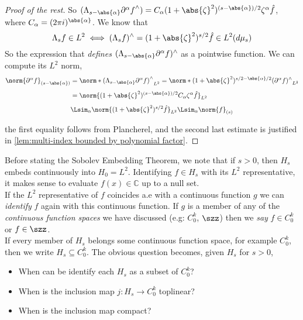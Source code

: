 \documentclass[../main-v2-manifolds.tex]{subfiles}
\begin{document}
\begin{proof}[Proof of the rest]
So $({\Lambda_{s-\abs{\alpha}}\partial^\alpha f}^{\wedge}) = C_{\alpha} (1+\abs{\zeta}^2)^{(s-\abs{\alpha})/2} \zeta^\alpha \hat{f}$, where $C_\alpha = (2\pi i)^{\abs{\alpha}}$. We know that 
\[
\Lambda_s f\in L^2\iff (\Lambda_s f)^{\wedge} = (1+\abs{\zeta}^2)^{s/2}\hat{f}\in L^2(d\mu_s)
\]
So the expression that \emph{defines} $(\Lambda_{s-\abs{\alpha}}\partial^\alpha f)^{\wedge}$ as a pointwise function. We can compute its $L^2$ norm, 
\begin{align*}
\norm{\partial^{\alpha}f}_{(s-\abs{\alpha})} &=\norm*{{(\Lambda_{s-\abs{\alpha}}\partial^\alpha f)}^{\wedge}}_{L^2}= \norm*{(1+\abs{\zeta}^2)^{s/2 - \abs{\alpha}/2}(\partial^\alpha f)^{\wedge}}_{L^2}\\[1ex]
&= \norm{(1+\abs{\zeta}^2)^{(s-\abs{\alpha})/2}C_{\alpha}\zeta^{\alpha}\hat{f}}_{L^2}\\[1ex]
&\Lsim_{\alpha}\norm{(1+\abs{\zeta}^2)^{s/2}\hat{f}}_{L^2}\Lsim_{\alpha}\norm{f}_{(s)}
\end{align*}

the first equality follows from Plancherel, and the second last estimate is justified in \cref{lem:multi-index bounded by polynomial factor}.
\end{proof}





Before stating the Sobolev Embedding Theorem, we note that if $s>0$, then $H_s$ embeds continuously into $H_0 = L^2$. Identifying $f\in H_s$ with its $L^2$ representative, it makes sense to evaluate $f(x)\in\mathbb{C}$ up to a null set.\\

If the $L^2$ representative of $f$ coincides a.e with a continuous function $g$ we can \emph{identify} $f$ again with this continuous function. If $g$ is a member of any of the \emph{continuous function spaces} we have discussed (e.g: $C_0^k$, $\szz$) then we \emph{say} $f\in C^{k}_0$ or $f\in \szz$.\\

If every member of $H_s$ belongs some continuous function space, for example $C_0^k$, then we write $H_s\subseteq C_0^k$. The obvious question becomes, given $H_s$ for $s>0$, 
\begin{itemize}
    \item When can be identify each $H_s$ as a subset of $C_0^k$?
    \item When is the inclusion map $j: H_s\to C_0^k$ toplinear?
    \item When is the inclusion map compact?
\end{itemize}
\end{document}
